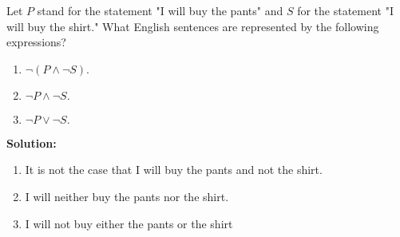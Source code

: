 Let $P$ stand for the statement  "I will buy the pants" and $S$ for the statement "I will buy the shirt." What English sentences are represented by the following expressions? 
\begin{enumerate}[label=(\alph*)]
    \item $\neg (P \wedge \neg S).$
    \item $\neg P \wedge \neg S.$
    \item $\neg P \vee \neg S.$
\end{enumerate}

\textbf{Solution:}
\begin{enumerate}[label=(\alph*)]
    \item It is not the case that I will buy the pants and not the shirt.
    \item I will neither buy the pants nor the shirt.
    \item I will not buy either the pants or the shirt
\end{enumerate}

\pagebreak